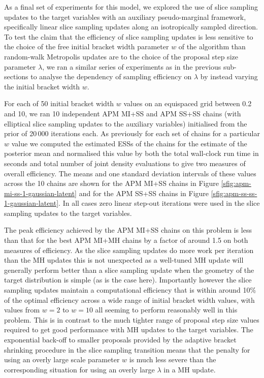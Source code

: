 As a final set of experiments for this model, we explored the use of slice sampling updates to the target variables with an auxiliary pseudo-marginal framework, specifically linear slice sampling updates along an isotropically sampled direction. To test the claim that the efficiency of slice sampling updates is less sensitive to the choice of the free initial bracket width parameter $w$ of the algorithm than random-walk Metropolis updates are to the choice of the proposal step size parameter $\lambda$, we ran a similar series of experiments as in the previous sub-sections to analyse the dependency of sampling efficiency on $\lambda$ by instead varying the initial bracket width $w$. 

For each of 50 initial bracket width $w$ values on an equispaced grid between 0.2 and 10, we ran 10 independent \ac{APM} \ac{MI}+\ac{SS} and \ac{APM} \ac{SS}+\ac{SS} chains (with elliptical slice sampling updates to the auxiliary variables) initialised from the prior of 20\,000 iterations each. As previously for each set of chains for a particular $w$ value we computed the estimated \acp{ESS} of the chains for the estimate of the posterior mean and normalised this value by both the total wall-clock run time in seconds and total number of joint density evaluations to give two measures of overall efficiency. The means and one standard deviation intervals of these values across the 10 chains are shown for the \ac{APM} \ac{MI}+\ac{SS} chains in Figure \ref{sfig:apm-mi-ss-1-gaussian-latent} and for the \ac{APM} \ac{SS}+\ac{SS} chains in Figure \ref{sfig:apm-ss-ss-1-gaussian-latent}. In all cases zero linear step-out iterations were used in the slice sampling updates to the target variables.

The peak efficiency achieved by the \ac{APM} \ac{MI}+\ac{SS} chains on this problem is less than that for the best \ac{APM} \ac{MI}+\ac{MH} chains by a factor of around 1.5 on both measures of efficiency. As the slice sampling updates do more work per iteration than the \ac{MH} updates this is not unexpected as a well-tuned \ac{MH} update will generally perform better than a slice sampling update when the geometry of the target distribution is simple (as is the case here). Importantly however the slice sampling updates maintain a computational efficiency that is within around 10\% of the optimal efficiency across a wide range of initial bracket width values, with values from $w=2$ to $w=10$ all seeming to perform reasonably well in this problem. This is in contrast to the much tighter range of proposal step size values required to get good performance with \ac{MH} updates to the target variables. The exponential back-off to smaller proposals provided by the adaptive bracket shrinking procedure in the slice sampling transition means that the penalty for using an overly large scale parameter $w$ is much less severe than the corresponding situation for using an overly large $\lambda$ in a \ac{MH} update.


